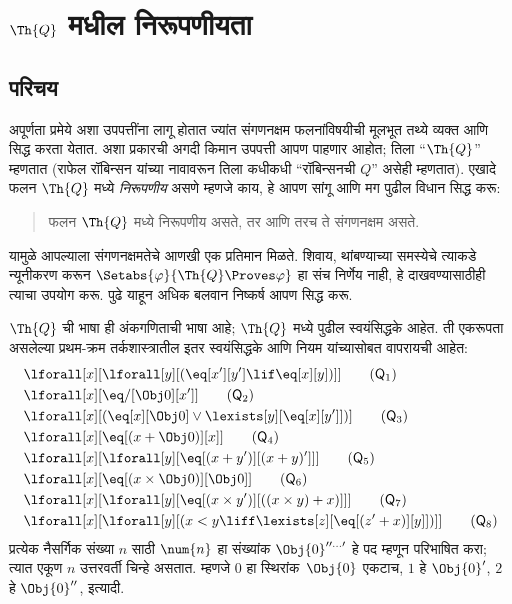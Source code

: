 \chapter{$\Th{Q}$ मधील निरूपणीयता}\label{inc:req::chap}








\section{परिचय}\label{inc:req:int:sec}

अपूर्णता प्रमेये अशा उपपत्तींना लागू होतात ज्यांत संगणनक्षम
फलनांविषयीची मूलभूत तथ्ये व्यक्त आणि सिद्ध करता येतात. अशा प्रकारची
अगदी किमान उपपत्ती आपण पाहणार आहोत; तिला ``$\Th{Q}$'' म्हणतात
(राफेल रॉबिन्सन यांच्या नावावरून तिला कधीकधी ``रॉबिन्सनची $Q$''
असेही म्हणतात). एखादे फलन $\Th{Q}$ मध्ये \emph{निरूपणीय} असणे म्हणजे
काय, हे आपण सांगू आणि मग पुढील विधान सिद्ध करू:
\begin{quote}
  फलन $\Th{Q}$ मध्ये निरूपणीय असते, तर आणि तरच ते संगणनक्षम असते.
\end{quote}
यामुळे आपल्याला संगणनक्षमतेचे आणखी एक प्रतिमान मिळते. शिवाय,
थांबण्याच्या समस्येचे त्याकडे न्यूनीकरण करून
$\Setabs{\varphi}{\Th{Q} \Proves \varphi}$ हा संच निर्णेय नाही, हे दाखवण्यासाठीही
त्याचा उपयोग करू. पुढे याहून अधिक बलवान निष्कर्ष आपण सिद्ध करू.

$\Th{Q}$ ची भाषा ही अंकगणिताची भाषा आहे; $\Th{Q}$ मध्ये पुढील
स्वयंसिद्धके आहेत. ती एकरूपता असलेल्या प्रथम-क्रम तर्कशास्त्रातील
इतर स्वयंसिद्धके आणि नियम यांच्यासोबत वापरायची आहेत:
\begin{align*}
& \lforall[x][\lforall[y][(\eq[x'][y'] \lif \eq[x][y])]] \tag{$\mathsf{Q}_1$}\\
& \lforall[x][\eq/[\Obj 0][x']] \tag{$\mathsf{Q}_2$}\\
& \lforall[x][(\eq[x][\Obj 0] \lor \lexists[y][\eq[x][y']])] \tag{$\mathsf{Q}_3$}\\
& \lforall[x][\eq[(x + \Obj 0)][x]] \tag{$\mathsf{Q}_4$}\\
& \lforall[x][\lforall[y][\eq[(x + y')][(x + y)']]] \tag{$\mathsf{Q}_5$}\\
& \lforall[x][\eq[(x \times \Obj 0)][\Obj 0]] \tag{$\mathsf{Q}_6$}\\
& \lforall[x][\lforall[y][\eq[(x \times y')][((x \times y) + x)]]] \tag{$\mathsf{Q}_7$}\\
& \lforall[x][\lforall[y][(x < y \liff \lexists[z][\eq[(z' + x)][y]])]] \tag{$\mathsf{Q}_8$}
\end{align*}
प्रत्येक नैसर्गिक संख्या $n$ साठी $\num{n}$ हा संख्यांक
$\Obj{0}^{\prime\prime\ldots\prime}$ हे पद म्हणून परिभाषित करा;
त्यात एकूण $n$ उत्तरवर्ती चिन्हे असतात. म्हणजे $\num{0}$ हा
स्थिरांक~$\Obj{0}$ एकटाच, $\num{1}$ हे $\Obj{0}'$,
$\num{2}$ हे $\Obj{0}''$, इत्यादी.

